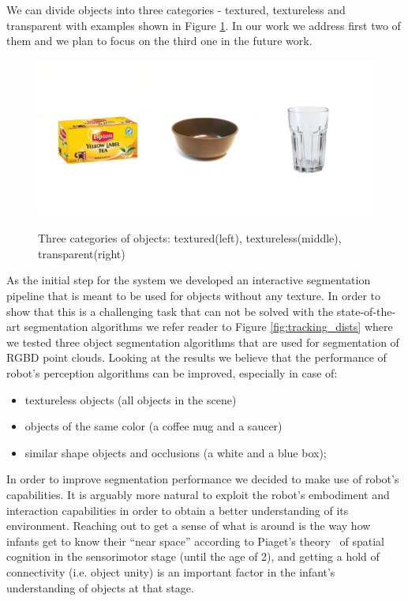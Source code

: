 	
We can divide objects into three categories - textured, textureless and transparent with examples shown in Figure \ref{fig:all-objects}. In our work we address first two of them and we plan to focus on the third one in the future work.

\begin{figure}

{\includegraphics[width=1\columnwidth]{figures/all-objects.jpg}}

\caption{Three categories of objects: textured(left), textureless(middle), transparent(right)}
\label{fig:all-objects}
\end{figure}

As the initial step for the system we developed an interactive segmentation pipeline that is meant to be used for objects without any texture. In order to show that this is a challenging task that can not be solved with the state-of-the-art segmentation algorithms we refer reader to Figure \ref{fig:tracking_dists} where we tested three object segmentation algorithms that are used for segmentation of RGBD point clouds. Looking at the results we believe that the performance of robot's perception algorithms can be improved, especially in case of: 

\begin{itemize} 
\item textureless objects (all objects in the scene)
\item objects of the same color (a coffee mug and a saucer)
\item similar shape objects and occlusions (a white and a blue box);
\end{itemize}


In order to improve segmentation performance we decided to make use of robot's
capabilities. It is arguably more natural to exploit the robot's embodiment
and interaction capabilities in order to obtain a better understanding of its environment.
Reaching out to get a sense of what is around is the way how infants get to know their
``near space'' according to Piaget's theory~\cite{infants} of spatial cognition in the sensorimotor stage 
(until the age of 2), and getting a hold of connectivity (i.e. object unity) is an important
factor in the infant's understanding of objects at that stage.











